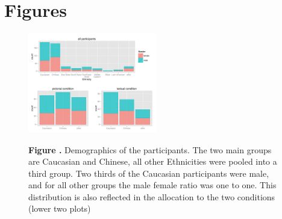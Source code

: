\documentclass{frontiersSCNS} %
\begin{document}
\section*{Figures}





\begin{figure}[h!]
\begin{center}
\includegraphics[width=0.5\textwidth]{figures/participants.pdf}
\end{center}
\textbf{\label{fig:01} Figure .}{ Demographics of the participants. The two main groups are Caucasian and Chinese, all other Ethnicities were pooled into a third group. Two thirds of the Caucasian participants were male, and for all other groups the male female ratio was one to one. This distribution is also reflected in the allocation to the two conditions (lower two plots)}
   \label{fig:demographics}
\end{figure}
\end{document}
